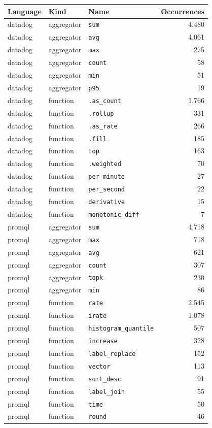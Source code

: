 \begin{tabular}{@{}lllr@{}}
\toprule
Language & Kind & Name & Occurrences \\
\midrule
datadog & aggregator & \texttt{sum} & 4,480 \\
datadog & aggregator & \texttt{avg} & 4,061 \\
datadog & aggregator & \texttt{max} & 275 \\
datadog & aggregator & \texttt{count} & 58 \\
datadog & aggregator & \texttt{min} & 51 \\
datadog & aggregator & \texttt{p95} & 19 \\
datadog & function & \texttt{.as\_count} & 1,766 \\
datadog & function & \texttt{.rollup} & 331 \\
datadog & function & \texttt{.as\_rate} & 266 \\
datadog & function & \texttt{.fill} & 185 \\
datadog & function & \texttt{top} & 163 \\
datadog & function & \texttt{.weighted} & 70 \\
datadog & function & \texttt{per\_minute} & 27 \\
datadog & function & \texttt{per\_second} & 22 \\
datadog & function & \texttt{derivative} & 15 \\
datadog & function & \texttt{monotonic\_diff} & 7 \\
promql & aggregator & \texttt{sum} & 4,718 \\
promql & aggregator & \texttt{max} & 718 \\
promql & aggregator & \texttt{avg} & 621 \\
promql & aggregator & \texttt{count} & 307 \\
promql & aggregator & \texttt{topk} & 230 \\
promql & aggregator & \texttt{min} & 86 \\
promql & function & \texttt{rate} & 2,545 \\
promql & function & \texttt{irate} & 1,078 \\
promql & function & \texttt{histogram\_quantile} & 507 \\
promql & function & \texttt{increase} & 328 \\
promql & function & \texttt{label\_replace} & 152 \\
promql & function & \texttt{vector} & 113 \\
promql & function & \texttt{sort\_desc} & 91 \\
promql & function & \texttt{label\_join} & 55 \\
promql & function & \texttt{time} & 50 \\
promql & function & \texttt{round} & 46 \\
\bottomrule
\end{tabular}
